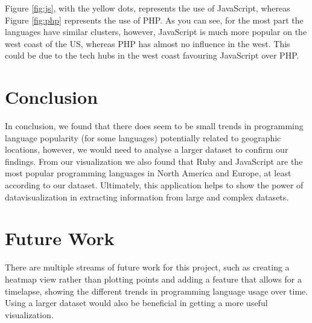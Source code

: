 \documentclass[11pt]{article}
\begin{document}
Figure \ref{fig:js}, with the yellow dots, represents the use of JavaScript, whereas Figure \ref{fig:php} represents the use of PHP. As you can see, for the most part the languages have similar clusters, however, JavaScript is much more popular on the west coast of the US, whereas PHP has almost no influence in the west. This could be due to the tech hubs in the west coast favouring JavaScript over PHP.

\section{Conclusion}
In conclusion, we found that there does seem to be small trends in programming language popularity (for some languages) potentially related to geographic locations, however, we would need to analyse a larger dataset to confirm our findings. From our visualization we also found that Ruby and JavaScript are the most popular programming languages in North America and Europe, at least according to our dataset. Ultimately, this application helps to show the power of datavisualization in extracting information from large and complex datasets.

\section{Future Work}
There are multiple streams of future work for this project, such as creating a heatmap view rather than plotting points and adding a feature that allows for a timelapse, showing the different trends in programming language usage over time. Using a larger dataset would also be beneficial in getting a more useful visualization.



\citation
\pagebreak
\onecolumn
\begingroup


\endgroup
\end{document}
